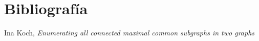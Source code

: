 
\section{Bibliografía}

\begingroup
\renewcommand{\section}[2]{}%

\begin{thebibliography}{}

 Ina Koch, {\em Enumerating all connected maximal common subgraphs in
two graphs}

\end{thebibliography}
